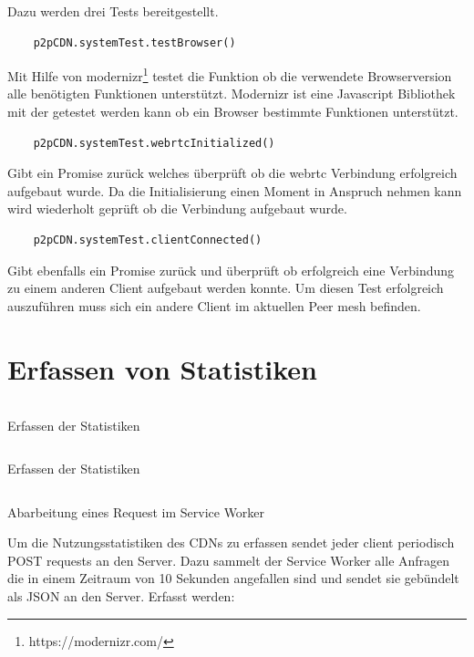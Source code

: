 Dazu werden drei Tests bereitgestellt.
\begin{lstlisting}
	p2pCDN.systemTest.testBrowser()
\end{lstlisting}
 Mit Hilfe von modernizr\footnote{https://modernizr.com/} testet die Funktion ob die verwendete Browserversion alle benötigten Funktionen unterstützt. Modernizr ist eine Javascript Bibliothek mit der getestet werden kann ob ein Browser bestimmte Funktionen unterstützt.
\begin{lstlisting}
	p2pCDN.systemTest.webrtcInitialized()
\end{lstlisting}
Gibt ein Promise zurück welches überprüft ob die webrtc Verbindung erfolgreich aufgebaut wurde. Da die Initialisierung einen Moment in Anspruch nehmen kann wird wiederholt geprüft ob die Verbindung aufgebaut wurde.
\begin{lstlisting}
	p2pCDN.systemTest.clientConnected()
\end{lstlisting}
Gibt ebenfalls ein Promise zurück und überprüft ob erfolgreich eine Verbindung zu einem anderen Client aufgebaut werden konnte. Um diesen Test erfolgreich auszuführen muss sich ein andere Client im aktuellen Peer mesh befinden.

\section{Erfassen von Statistiken}\label{ch:implementation:stats}
\begin{listing}[h]
	\inputminted{javascript}{listings/sendStatistic.js}
	\caption{Erfassen der Statistiken}
	\label{lst:code-stats}
\end{listing}
\begin{listing}[h]
	\inputminted{javascript}{listings/logStatistic.js}
	\caption{Erfassen der Statistiken}
	\label{lst:code-stats}
\end{listing}
\begin{listing}[h]
	\inputminted{javascript}{listings/handle_request.js}
	\caption{Abarbeitung eines Request im Service Worker}
	\label{lst:handle_request}
\end{listing}

Um die Nutzungsstatistiken des CDNs zu erfassen sendet jeder client periodisch POST requests an den Server. Dazu sammelt der Service Worker alle Anfragen die in einem Zeitraum von 10 Sekunden angefallen sind und sendet sie gebündelt als JSON an den Server.
Erfasst werden:

